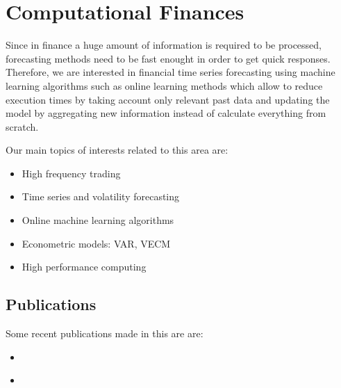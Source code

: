 \section{Computational Finances}

Since in finance a huge amount of information is required to be processed,
forecasting methods need to be fast enought in order to get quick responses.
Therefore, we are interested in financial time series forecasting using machine
learning algorithms such as online learning methods which allow to reduce
execution times by taking account only relevant past data and updating the model
by aggregating new information instead of calculate everything from scratch. 

Our main topics of interests related to this area are:

\begin{itemize}
\item High frequency trading
\item Time series and volatility forecasting
\item Online machine learning algorithms
\item Econometric models: VAR, VECM
\item High performance computing
\end{itemize}


\subsection{Publications}
Some recent publications made in this are are:
\begin{itemize}
\item \cite{arce+salinas2012}
\item \cite{arceetAl2012}
\end{itemize}
